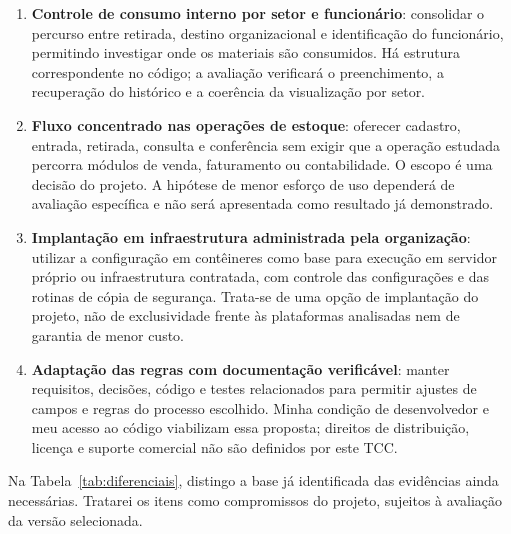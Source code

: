 \begin{enumerate}
    \item \textbf{Controle de consumo interno por setor e funcionário}: consolidar o percurso entre retirada, destino organizacional e identificação do funcionário, permitindo investigar onde os materiais são consumidos. Há estrutura correspondente no código; a avaliação verificará o preenchimento, a recuperação do histórico e a coerência da visualização por setor.
    \item \textbf{Fluxo concentrado nas operações de estoque}: oferecer cadastro, entrada, retirada, consulta e conferência sem exigir que a operação estudada percorra módulos de venda, faturamento ou contabilidade. O escopo é uma decisão do projeto. A hipótese de menor esforço de uso dependerá de avaliação específica e não será apresentada como resultado já demonstrado.
    \item \textbf{Implantação em infraestrutura administrada pela organização}: utilizar a configuração em contêineres como base para execução em servidor próprio ou infraestrutura contratada, com controle das configurações e das rotinas de cópia de segurança. Trata-se de uma opção de implantação do projeto, não de exclusividade frente às plataformas analisadas nem de garantia de menor custo.
    \item \textbf{Adaptação das regras com documentação verificável}: manter requisitos, decisões, código e testes relacionados para permitir ajustes de campos e regras do processo escolhido. Minha condição de desenvolvedor e meu acesso ao código viabilizam essa proposta; direitos de distribuição, licença e suporte comercial não são definidos por este TCC.
\end{enumerate}

Na Tabela~\ref{tab:diferenciais}, distingo a base já identificada das evidências ainda necessárias. Tratarei os itens como compromissos do projeto, sujeitos à avaliação da versão selecionada.

